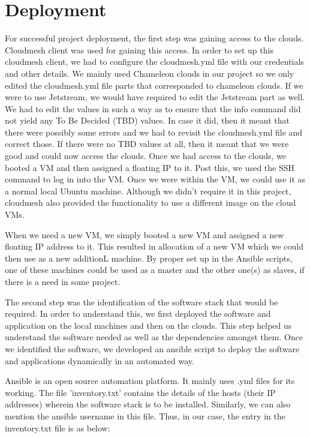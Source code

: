 \documentclass[9pt,twocolumn,twoside]{../../styles/osajnl}
\begin{document}
\section{Deployment}

For successful project deployment, the first step was gaining access
to the clouds.  Cloudmesh client was used for gaining this access.  In
order to set up this cloudmesh client, we had to configure the
cloudmesh.yml file with our credentials and other details.  We mainly
used Chameleon clouds in our project so we only edited the
cloudmesh.yml file parts that corresponded to chameleon clouds.  If we
were to use Jetstream, we would have required to edit the Jetstream
part as well.  We had to edit the values in such a way as to ensure
that the info command did not yield any To Be Decided (TBD) values.
In case it did, then it meant that there were possibly some errors and
we had to revisit the cloudmesh.yml file and correct those.  If there
were no TBD values at all, then it meant that we were good and could
now access the clouds.  Once we had access to the clouds, we booted a
VM and then assigned a floating IP to it.  Post this, we used the SSH
command to log in into the VM.  Once we were within the VM, we could
use it as a normal local Ubuntu machine.  Although we didn't require
it in this project, cloudmesh also provided the functionality to use a
different image on the cloud VMs.

When we need a new VM, we simply booted a new VM and assigned a new
floating IP address to it.  This resulted in allocation of a new VM
which we could then use as a new additionL machine.  By proper set up
in the Ansible scripts, one of these machines could be used as a
master and the other one(s) as slaves, if there is a need in some
project.

The second step was the identification of the software stack that
would be required.  In order to understand this, we first deployed the
software and application on the local machines and then on the
clouds.  This step helped us understand the software needed as well
as the dependencies amongst them.  Once we identified the software,
we developed an ansible script to deploy the software and
applications dynamically in an automated way.

Ansible is an open source automation platform.  It mainly uses .yml
files for its working.  The file 'inventory.txt' contains the details
of the hosts (their IP addresses) wherein the software stack is to be
installed.  Similarly, we can also mention the ansible username in
this file.  Thus, in our case, the entry in the inventory.txt file is
as below:
\end{document}
